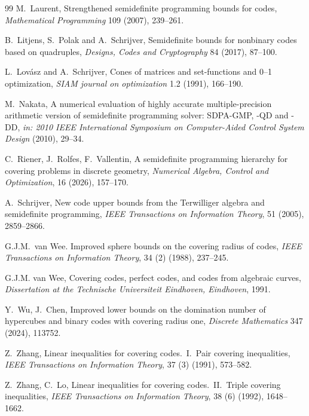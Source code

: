 \documentclass[10pt,a4paper]{article}
\theoremstyle{definition}
\begin{document}
\begin{thebibliography}{99}
 M.\ Laurent, Strengthened semidefinite programming bounds for codes, \textsl{Mathematical Programming} 109 (2007), 239--261.


 B.\ Litjens, S.\ Polak and A.\ Schrijver, Semidefinite bounds for nonbinary codes based on quadruples, \textsl{Designs, Codes and Cryptography} 84 (2017), 87--100.

 L.\ Lov\'asz and A.\ Schrijver, Cones of matrices and set-functions and 0--1 optimization, \textsl{SIAM journal on optimization} 1.2 (1991), 166--190. 


 M.\ Nakata, A numerical evaluation of highly accurate multiple-precision arithmetic version of semidefinite programming solver: SDPA-GMP, -QD and -DD, \textsl{in: 2010 IEEE International Symposium on Computer-Aided Control System Design} (2010), 29--34. 

 C.\ Riener, J.\ Rolfes, F.\ Vallentin, A semidefinite programming hierarchy for covering problems in discrete geometry, \textsl{Numerical Algebra, Control and Optimization}, 16 (2026), 157--170.


 A.\ Schrijver, New code upper bounds from the Terwilliger algebra and semidefinite programming, \textsl{IEEE Transactions on Information Theory}, 51 (2005), 2859--2866.


 G.J.M.\ van Wee. Improved sphere bounds on the covering radius of codes, \textsl{IEEE Transactions on Information Theory}, 34 (2) (1988), 237--245.

 G.J.M. van Wee, Covering codes, perfect codes, and codes from algebraic curves, \textsl{Dissertation at the Technische Universiteit Eindhoven, Eindhoven}, 1991.

 Y.\ Wu, J.\ Chen, Improved lower bounds on the domination number of hypercubes and binary codes with covering radius one, \textsl{Discrete Mathematics} 347 (2024), 113752.


 Z.\ Zhang, Linear inequalities for covering codes.\ I.\ Pair covering inequalities, \textsl{IEEE
Transactions on Information Theory}, 37 (3) (1991), 573--582.


 Z.\ Zhang, C.\ Lo, Linear inequalities for covering codes.\ II.\ Triple covering inequalities, \textsl{IEEE
Transactions on Information Theory}, 38 (6) (1992), 1648--1662.

\end{thebibliography}
\end{document}
